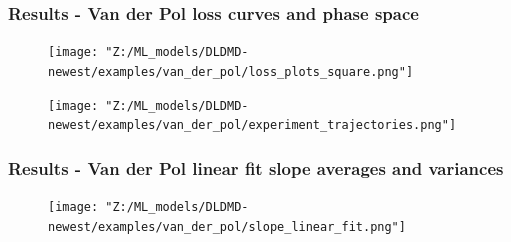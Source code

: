 \documentclass[11pt,aspectratio=169]{beamer}
\begin{document}
    \begin{frame}
        \frametitle{Results - Van der Pol loss curves and phase space}
        \begin{figure}
            \centering
            \begin{minipage}{.5\textwidth}
                \texttt{[image: "Z:/ML\_models/DLDMD-newest/examples/van\_der\_pol/loss\_plots\_square.png"]}
            \end{minipage}%
            \begin{minipage}{.5\textwidth}
                \texttt{[image: "Z:/ML\_models/DLDMD-newest/examples/van\_der\_pol/experiment\_trajectories.png"]}
            \end{minipage}
        \end{figure}
    \end{frame}

    \begin{frame}
        \frametitle{Results - Van der Pol linear fit slope averages and variances}
        
        \begin{figure}
            \centering
            \texttt{[image: "Z:/ML\_models/DLDMD-newest/examples/van\_der\_pol/slope\_linear\_fit.png"]}
        \end{figure}
    \end{frame}
\end{document}
